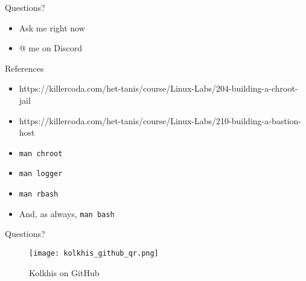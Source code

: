 \documentclass[14pt,compress,dvipsnames,aspectratio=169]{beamer} %
\begin{document}
\begin{frame}{Questions?}
    \begin{itemize}
        \vspace{1.0cm}
        \item{Ask me right now}
        \vspace{1.0cm}
        \item{@ me on Discord} 
    \end{itemize}
\end{frame}

\begin{frame}{References}
    \begin{itemize}
        \item{https://killercoda.com/het-tanis/course/Linux-Labs/204-building-a-chroot-jail}
        \item{https://killercoda.com/het-tanis/course/Linux-Labs/210-building-a-bastion-host}
        \item{\texttt{man chroot}}
        \item{\texttt{man logger}}
        \item{\texttt{man rbash}}
        \item{And, as always, \texttt{man bash}}
    \end{itemize}
\end{frame}

\begin{frame}{Questions?}
    \begin{figure}
        \centering
        \texttt{[image: kolkhis\_github\_qr.png]}
        \caption{Kolkhis on GitHub}
        \label{GH-QR-Code}
    \end{figure}
\end{frame}
\end{document}
